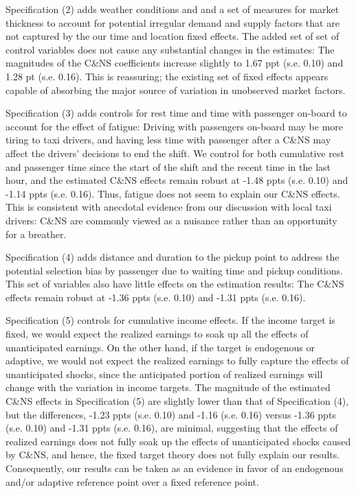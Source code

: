 \documentclass[reviewmode]{restat}
\begin{document}
Specification (2) adds weather conditions and and a set of measures for market thickness to account for potential irregular demand and supply factors that are not captured by the our time and location fixed effects. The added set of set of control variables does not cause any substantial changes in the estimates: The magnitudes of the C\&NS coefficients increase slightly to 1.67 ppt (s.e. 0.10) and 1.28 pt (s.e. 0.16). This is reassuring; the existing set of fixed effects appears capable of absorbing the major source of variation in unobserved market factors.

Specification (3) adds controls for rest time and time with passenger on-board to account for the effect of fatigue: Driving with passengers on-board may be more tiring to taxi drivers, and having less time with passenger after a C\&NS may affect the drivers' decisions to end the shift. We control for both cumulative rest and passenger time since the start of the shift and the recent time in the last hour, and the estimated C\&NS effects remain robust at -1.48 ppts (s.e. 0.10) and -1.14 ppts (s.e. 0.16). Thus, fatigue does not seem to explain our C\&NS effects. This is consistent with anecdotal evidence from our discussion with local taxi drivers: C\&NS are commonly viewed as a nuisance rather than an opportunity for a breather.

Specification (4) adds distance and duration to the pickup point to address the potential selection bias by passenger due to waiting time and pickup conditions. This set of variables also have little effects on the estimation results: The C\&NS effects remain robust at -1.36 ppts (s.e. 0.10) and -1.31 ppts (s.e. 0.16).

Specification (5) controls for cumulative income effects. If the income target is fixed, we would expect the realized earnings to soak up all the effects of unanticipated earnings. On the other hand, if the target is endogenous or adaptive, we would not expect the realized earnings to fully capture the effects of unanticipated shocks, since the anticipated portion of realized earnings will change with the variation in income targets. The magnitude of the estimated C\&NS effects in Specification (5) are slightly lower than that of Specification (4), but the differences, -1.23 ppts (s.e. 0.10) and -1.16 (s.e. 0.16) versus -1.36 ppts (s.e. 0.10) and -1.31 ppts (s.e. 0.16), are minimal, suggesting that the effects of realized earnings does not fully soak up the effects of unanticipated shocks caused by C\&NS, and hence, the fixed target theory does not fully explain our results. Consequently, our results can be taken as an evidence in favor of an endogenous and/or adaptive reference point over a fixed reference point. 
\end{document}
